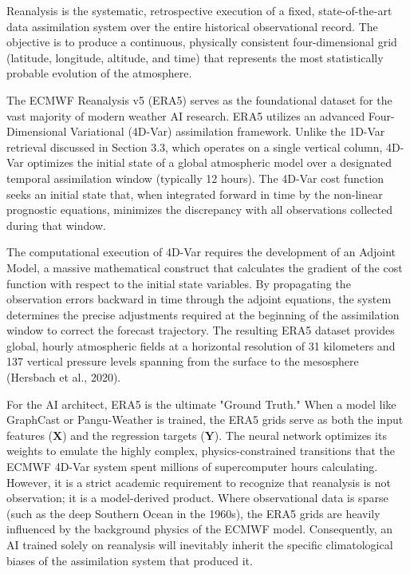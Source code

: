 Reanalysis is the systematic, retrospective execution of a fixed, state-of-the-art data assimilation system over the entire historical observational record. The objective is to produce a continuous, physically consistent four-dimensional grid (latitude, longitude, altitude, and time) that represents the most statistically probable evolution of the atmosphere. 

The ECMWF Reanalysis v5 (ERA5) serves as the foundational dataset for the vast majority of modern weather AI research. ERA5 utilizes an advanced Four-Dimensional Variational (4D-Var) assimilation framework. Unlike the 1D-Var retrieval discussed in Section 3.3, which operates on a single vertical column, 4D-Var optimizes the initial state of a global atmospheric model over a designated temporal assimilation window (typically 12 hours). The 4D-Var cost function seeks an initial state that, when integrated forward in time by the non-linear prognostic equations, minimizes the discrepancy with all observations collected during that window.

The computational execution of 4D-Var requires the development of an Adjoint Model, a massive mathematical construct that calculates the gradient of the cost function with respect to the initial state variables. By propagating the observation errors backward in time through the adjoint equations, the system determines the precise adjustments required at the beginning of the assimilation window to correct the forecast trajectory. The resulting ERA5 dataset provides global, hourly atmospheric fields at a horizontal resolution of 31 kilometers and 137 vertical pressure levels spanning from the surface to the mesosphere (Hersbach et al., 2020).

For the AI architect, ERA5 is the ultimate "Ground Truth." When a model like GraphCast or Pangu-Weather is trained, the ERA5 grids serve as both the input features ($\mathbf{X}$) and the regression targets ($\mathbf{Y}$). The neural network optimizes its weights to emulate the highly complex, physics-constrained transitions that the ECMWF 4D-Var system spent millions of supercomputer hours calculating. However, it is a strict academic requirement to recognize that reanalysis is not observation; it is a model-derived product. Where observational data is sparse (such as the deep Southern Ocean in the 1960s), the ERA5 grids are heavily influenced by the background physics of the ECMWF model. Consequently, an AI trained solely on reanalysis will inevitably inherit the specific climatological biases of the assimilation system that produced it.

